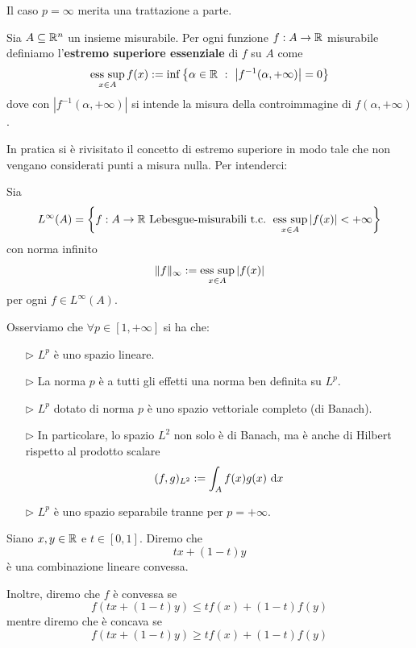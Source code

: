 Il caso $p=\infty$ merita una trattazione a parte.

\begin{defn}
Sia $A\subseteq\mathbb{R}^n$ un insieme misurabile. Per ogni funzione $f:A\to\mathbb{R}$ misurabile definiamo l'\textbf{estremo superiore essenziale} di $f$ su $A$ come
$$
\operatorname*{ess\ sup}_{x\in A} f(x):=\inf\left\{ \alpha\in\mathbb{R}\ :\ \left|f^{-1}(\alpha,+\infty) \right|=0 \right\}
$$
dove con $\left|f^{-1}(\alpha,+\infty) \right|$ si intende la misura della controimmagine di $f(\alpha,+\infty)$.
\end{defn}
In pratica si è rivisitato il concetto di estremo superiore in modo tale che non vengano considerati punti a misura nulla. Per intenderci:

\begin{defn}
Sia
\begin{equation*}
L^{\infty}(A) = \left\{f: A\rightarrow \mathbb{R}\text{ Lebesgue-misurabili t.c. }\operatorname*{ess\ sup}_{x\in A} |f(x)|<+ \infty \right\}
\end{equation*}
con norma infinito
\begin{equation*}
\Vert f \Vert_{\infty} := \operatorname*{ess\ sup}_{x\in A} |f(x)|
\end{equation*}
per ogni $f\in L^\infty(A)$.
\end{defn}

Osserviamo che $\forall p\in[1,+\infty]$ si ha che:
\begin{enumerate}
    \item [$\triangleright$] $L^p$ è uno spazio lineare.

    \item [$\triangleright$] La norma $p$ è a tutti gli effetti una norma ben definita su $L^p$.

    \item [$\triangleright$] $L^p$ dotato di norma $p$ è uno spazio vettoriale completo (di Banach).

    \item [$\triangleright$] In particolare, lo spazio $L^2$ non solo è di Banach, ma è anche di Hilbert rispetto al prodotto scalare
    $$
    (f,g)_{L^2}:=\int_A f(x) g(x)\  \mathrm{d} x
    $$

    \item [$\triangleright$] $L^p$ è uno spazio separabile tranne per $p=+\infty$.
\end{enumerate}

\begin{defn}
Siano $x,y\in\mathbb{R}$ e $t\in[0,1]$. Diremo che
$$
tx+(1-t)y
$$
è una combinazione lineare convessa.

Inoltre, diremo che $f$ è convessa se
$$
f(tx+(1-t)y)\leq t f(x)+(1-t)f(y)
$$
mentre diremo che è concava se
$$
f(tx+(1-t)y)\geq t f(x)+(1-t)f(y)
$$
\end{defn}


